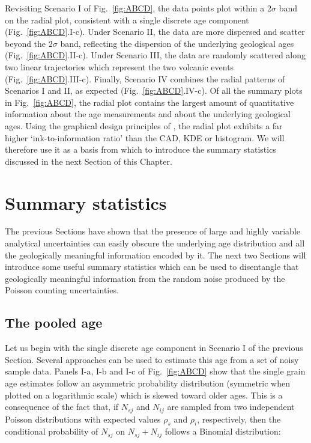 \documentclass{article}
\begin{document}
Revisiting Scenario I of Fig.~\ref{fig:ABCD}, the data points plot
within a 2$\sigma$ band on the radial plot, consistent with a single
discrete age component (Fig.~\ref{fig:ABCD}.I-c). Under Scenario II,
the data are more dispersed and scatter beyond the 2$\sigma$ band,
reflecting the dispersion of the underlying geological ages
(Fig.~\ref{fig:ABCD}.II-c). Under Scenario III, the data are randomly
scattered along two linear trajectories which represent the two
volcanic events (Fig.~\ref{fig:ABCD}.III-c). Finally, Scenario IV
combines the radial patterns of Scenarios I and II, as expected
(Fig.~\ref{fig:ABCD}.IV-c). Of all the summary plots in
Fig.~\ref{fig:ABCD}, the radial plot contains the largest amount of
quantitative information about the age measurements and about the
underlying geological ages. Using the graphical design principles of
\citet{tufte1983}, the radial plot exhibits a far higher
`ink-to-information ratio' than the CAD, KDE or histogram.  We will
therefore use it as a basis from which to introduce the summary
statistics discussed in the next Section of this Chapter.

\section{Summary statistics}
\label{sec:summarystats}

The previous Sections have shown that the presence of large and highly
variable analytical uncertainties can easily obscure the underlying
age distribution and all the geologically meaningful information
encoded by it. The next two Sections will introduce some useful
summary statistics which can be used to disentangle that geologically
meaningful information from the random noise produced by the Poisson
counting uncertainties.

\subsection{The pooled age}
\label{sec:pooled}

Let us begin with the single discrete age component in Scenario I of
the previous Section.  Several approaches can be used to estimate this
age from a set of noisy sample data. Panels I-a, I-b and I-c of
Fig.~\ref{fig:ABCD} show that the single grain age estimates follow an
asymmetric probability distribution (symmetric when plotted on a
logarithmic scale) which is skewed toward older ages. This is a
consequence of the fact that, if $N_{sj}$ and $N_{ij}$ are sampled
from two independent Poisson distributions with expected values
$\rho_s$ and $\rho_i$, respectively, then the conditional probability
of $N_{sj}$ on $N_{sj} + N_{ij}$ follows a Binomial distribution:
\end{document}
